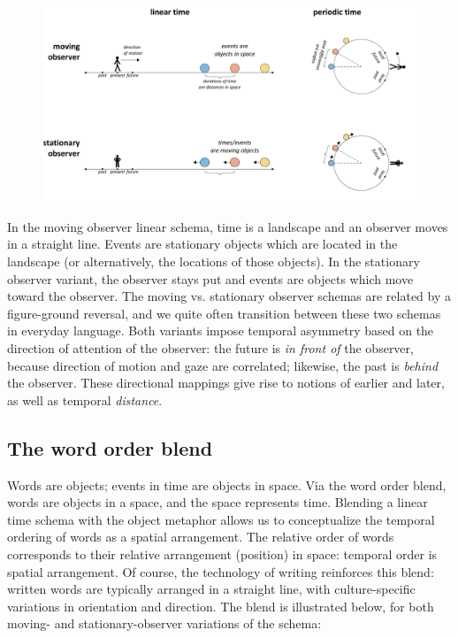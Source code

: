   
\begin{figure}
\includegraphics[width=\textwidth]{figures/Tilsen-img38.png}
\caption{\missingcaption}
\label{fig:3:10}
\end{figure}
 

  In the moving observer linear schema, time is a landscape and an observer moves in a straight line. Events are stationary objects which are located in the landscape (or alternatively, the locations of those objects). In the stationary observer variant, the observer stays put and events are objects which move toward the observer. The moving vs. stationary observer schemas are related by a figure-ground reversal, and we quite often transition between these two schemas in everyday language. Both variants impose temporal asymmetry based on the direction of attention of the observer: the future is \textit{in front of} the observer, because direction of motion and gaze are correlated; likewise, the past is \textit{behind} the observer. These directional mappings give rise to notions of earlier and later, as well as temporal \textit{distance}. 

\subsection{The word order blend}

Words are objects; events in time are objects in space. Via the word order blend, words are objects in a space, and the space represents time. Blending a linear time schema with the object metaphor allows us to conceptualize the temporal ordering of words as a spatial arrangement. The relative order of words corresponds to their relative arrangement (position) in space: temporal order is spatial arrangement. Of course, the technology of writing reinforces this blend: written words are typically arranged in a straight line, with culture-specific variations in orientation and direction. The blend is illustrated below, for both moving- and stationary-observer variations of the schema:

